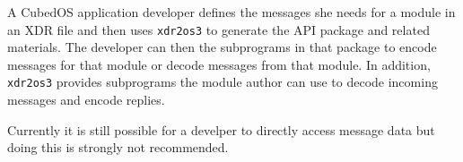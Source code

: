 A CubedOS application developer defines the messages she needs for a module in an XDR file and
then uses \texttt{xdr2os3} to generate the API package and related materials. The developer can
then the subprograms in that package to encode messages for that module or decode messages from
that module. In addition, \texttt{xdr2os3} provides subprograms the module author can use to
decode incoming messages and encode replies.

Currently it is still possible for a develper to directly access message data but doing this is
strongly not recommended. 
